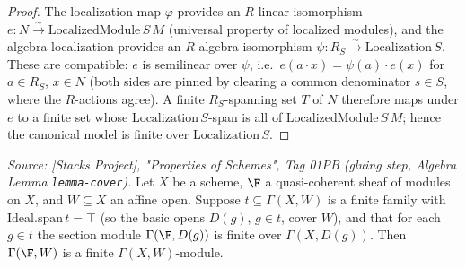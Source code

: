 \begin{proof}

\leanok
  The localization map \(\varphi\) provides an \(R\)-linear isomorphism
  \(e : N \xrightarrow{\sim} \mathrm{LocalizedModule}\,S\,M\) (universal property
  of localized modules), and the algebra localization provides an \(R\)-algebra
  isomorphism \(\psi : R_S \xrightarrow{\sim} \mathrm{Localization}\,S\). These
  are compatible: \(e\) is semilinear over \(\psi\), i.e.\ \(e(a \cdot x) =
  \psi(a) \cdot e(x)\) for \(a \in R_S\), \(x \in N\) (both sides are pinned by
  clearing a common denominator \(s \in S\), where the \(R\)-actions agree). A
  finite \(R_S\)-spanning set \(T\) of \(N\) therefore maps under \(e\) to a
  finite set whose \(\mathrm{Localization}\,S\)-span is all of
  \(\mathrm{LocalizedModule}\,S\,M\); hence the canonical model is finite over
  \(\mathrm{Localization}\,S\).
\end{proof}

\begin{lemma}
  \label{lem:gf_finite_sections_of_basicOpen_finite_cover}
  \textit{Source: [Stacks Project], "Properties of Schemes", Tag 01PB (gluing step,
  Algebra Lemma \texttt{lemma-cover}).}
  Let \(X\) be a scheme, \(\F\) a quasi-coherent sheaf of modules on \(X\), and
  \(W \subseteq X\) an affine open. Suppose \(t \subseteq \Gamma(X, W)\) is a finite
  family with \(\mathrm{Ideal.span}\,t = \top\) (so the basic opens \(D(g)\),
  \(g \in t\), cover \(W\)), and that for each \(g \in t\) the section module
  \(\Gamma(\F, D(g))\) is finite over \(\Gamma(X, D(g))\). Then \(\Gamma(\F, W)\)
  is a finite \(\Gamma(X, W)\)-module.
\end{lemma}

